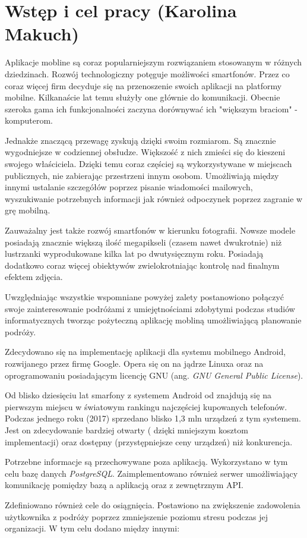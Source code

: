 \documentclass[10pt,twoside,a4paper]{report}
\begin{document}
\chapter{Wstęp i cel pracy (Karolina Makuch)}  
\par Aplikacje mobline są coraz popularniejszym rozwiązaniem stosowanym w różnych dziedzinach. Rozwój technologiczny potęguje możliwości smartfonów. Przez co coraz więcej firm decyduje się na przenoszenie swoich aplikacji na platformy mobilne. Kilkanaście lat temu  służyły one głównie do komunikacji. Obecnie szeroka gama ich funkcjonalności zaczyna dorównywać ich "większym braciom" - komputerom.  
\par Jednakże znaczącą przewagę zyskują dzięki swoim rozmiarom. Są znacznie wygodniejsze w codziennej obsłudze. Większość z nich zmieści się do kieszeni swojego właściciela. Dzięki temu coraz częściej są wykorzystywane w miejscach publicznych, nie zabierając przestrzeni innym osobom. Umożliwiają między innymi ustalanie szczegółów poprzez pisanie wiadomości mailowych, wyszukiwanie potrzebnych informacji jak również odpoczynek poprzez zagranie w grę mobilną.
\par Zauważalny jest także rozwój smartfonów w kierunku fotografii. Nowsze modele posiadają znacznie większą ilość megapikseli (czasem nawet dwukrotnie) niż lustrzanki wyprodukowane kilka lat po dwutysięcznym roku. Posiadają dodatkowo coraz więcej obiektywów zwielokrotniając kontrolę nad finalnym efektem zdjęcia.    
\par Uwzględniając wszystkie wspomniane powyżej zalety postanowiono połączyć swoje zainteresowanie podróżami z umiejętnościami zdobytymi podczas studiów informatycznych tworząc pożyteczną aplikację mobliną umożliwiającą planowanie podróży. 
\par Zdecydowano się na implementację aplikacji dla systemu mobilnego Android, rozwijanego przez firmę Google. Opera się on na jądrze Linuxa oraz na oprogramowaniu posiadającym licencję GNU (ang. \textit{GNU General Public License}).
 \par Od blisko dziesięciu lat smarfony z systemem Android od znajdują się na pierwszym miejscu w światowym rankingu najczęściej kupowanych telefonów. Podczas jednego roku (2017) sprzedano blisko 1,3 mln urządzeń z tym systemem. Jest on zdecydowanie bardziej otwarty ( dzięki mniejszym kosztom implementacji) oraz dostępny (przystępniejsze ceny urządzeń) niż konkurencja.  
\par Potrzebne informacje są przechowywane poza aplikacją. Wykorzystano w tym celu bazę danych \textit{PostgreSQL}. Zaimplementowano również serwer umożliwiający komunikację pomiędzy bazą a aplikacją oraz z zewnętrznym API.
\par Zdefiniowano również cele do osiągnięcia. Postawiono na zwiększenie zadowolenia użytkownika z podróży poprzez zmniejszenie poziomu stresu podczas jej organizacji. W tym celu dodano między innymi: 
\end{document}

